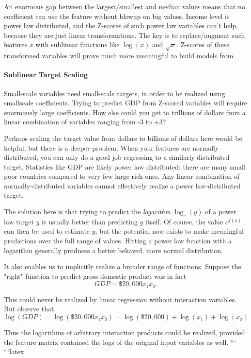 \documentclass[10pt]{article}
\begin{document}
An enormous gap between the largest/smallest and median values means that no coefficient can use the feature without blowup on big values. Income level is power law distributed, and the Z-scores of such power law variables can't help, because they are just linear transformations. The key is to replace/augment such features $x$ with sublinear functions like $\log(x)$ and $\sqrt{x}$. Z-scores of these transformed variables will prove much more meaningful to build models from.

\paragraph{Sublinear Target Scaling}
Small-scale variables need small-scale targets, in order to be realized using smallscale coefficients. Trying to predict GDP from Z-scored variables will require enormously large coefficients. How else could you get to trillions of dollars from a linear combination of variables ranging from -3 to +3?

Perhaps scaling the target value from dollars to billions of dollars here would be helpful, but there is a deeper problem. When your features are normally distributed, you can only do a good job regressing to a similarly distributed target. Statistics like GDP are likely power law distributed: there are many small poor countries compared to very few large rich ones. Any linear combination of normally-distributed variables cannot effectively realize a power law-distributed target.

The solution here is that trying to predict the \textit{logarithm} $\log_{c}(y)$ of a power law target $y$ is usually better than predicting $y$ itself. Of course, the value $c^{f(x)}$ can then be used to estimate $y$, but the potential now exists to make meaningful predictions over the full range of values. Hitting a power law function with a logarithm generally produces a better behaved, more normal distribution.

It also enables us to implicitly realize a broader range of functions. Suppose the "right" function to predict gross domestic product was in fact
\[ GDP=\$ 20,000 x_{1} x_{2} . \]

This could never be realized by linear regression without interaction variables. But observe that
\[
\log (G D P)=\log \left(\$ 20,000 x_{1} x_{2}\right)=\log (\$ 20,000)+\log \left(x_{1}\right)+\log \left(x_{2}\right)
\]

Thus the logarithms of arbitrary interaction products could be realized, provided the feature matrix contained the logs of the original input variables as well.
```
```latex
\end{document}
